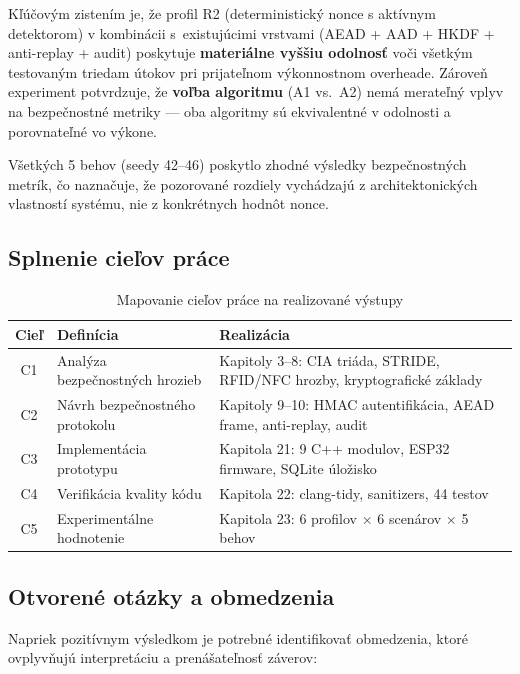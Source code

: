 \noindent Kľúčovým zistením je, že profil R2 (deterministický nonce s aktívnym detektorom) v kombinácii s~existujúcimi vrstvami (AEAD + AAD + HKDF + anti-replay + audit) poskytuje \textbf{materiálne vyššiu odolnosť} voči všetkým testovaným triedam útokov pri prijateľnom výkonnostnom overheade. Zároveň experiment potvrdzuje, že \textbf{voľba algoritmu} (A1 vs.\ A2) nemá merateľný vplyv na bezpečnostné metriky --- oba algoritmy sú ekvivalentné v odolnosti a porovnateľné vo výkone.

Všetkých 5 behov (seedy 42--46) poskytlo zhodné výsledky bezpečnostných metrík, čo naznačuje, že pozorované rozdiely vychádzajú z architektonických vlastností systému, nie z konkrétnych hodnôt nonce.

\subsection{Splnenie cieľov práce}

\begin{table}[htbp]
\renewcommand{\arraystretch}{1.3}
\centering
\caption{Mapovanie cieľov práce na realizované výstupy}
\label{tab:goals-mapping}
\begin{tabular}{c p{5.8cm} p{5.8cm}}
\toprule
\textbf{Cieľ} & \textbf{Definícia} & \textbf{Realizácia} \\
\midrule
C1 & Analýza bezpečnostných hrozieb & Kapitoly 3--8: CIA triáda, STRIDE\cite{STRIDE}, RFID/NFC hrozby, kryptografické základy \\
C2 & Návrh bezpečnostného protokolu & Kapitoly 9--10: HMAC autentifikácia, AEAD frame, anti-replay, audit \\
C3 & Implementácia prototypu & Kapitola 21: 9 C++ modulov, ESP32 firmware, SQLite úložisko \\
C4 & Verifikácia kvality kódu & Kapitola 22: clang-tidy, sanitizers, 44 testov \\
C5 & Experimentálne hodnotenie & Kapitola 23: 6 profilov $\times$ 6 scenárov $\times$ 5 behov \\
\bottomrule
\end{tabular}
\end{table}

\subsection{Otvorené otázky a obmedzenia}

Napriek pozitívnym výsledkom je potrebné identifikovať obmedzenia, ktoré ovplyvňujú interpretáciu a prenášateľnosť záverov:

